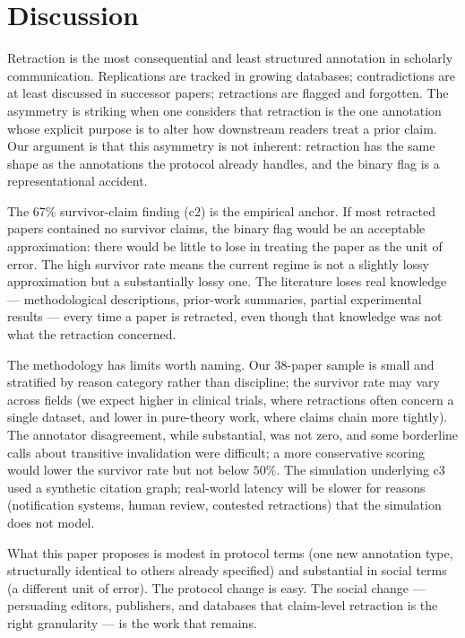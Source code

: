 \documentclass{rrxiv}
\begin{document}
\section{Discussion}
\label{sec:discussion}
Retraction is the most consequential and least structured annotation in scholarly communication. Replications are tracked in growing databases; contradictions are at least discussed in successor papers; retractions are flagged and forgotten. The asymmetry is striking when one considers that retraction is the one annotation whose explicit purpose is to alter how downstream readers treat a prior claim. Our argument is that this asymmetry is not inherent: retraction has the same shape as the annotations the protocol already handles, and the binary flag is a representational accident.

The 67\% survivor-claim finding (c2) is the empirical anchor. If most retracted papers contained no survivor claims, the binary flag would be an acceptable approximation: there would be little to lose in treating the paper as the unit of error. The high survivor rate means the current regime is not a slightly lossy approximation but a substantially lossy one. The literature loses real knowledge --- methodological descriptions, prior-work summaries, partial experimental results --- every time a paper is retracted, even though that knowledge was not what the retraction concerned.

The methodology has limits worth naming. Our 38-paper sample is small and stratified by reason category rather than discipline; the survivor rate may vary across fields (we expect higher in clinical trials, where retractions often concern a single dataset, and lower in pure-theory work, where claims chain more tightly). The annotator disagreement, while substantial, was not zero, and some borderline calls about transitive invalidation were difficult; a more conservative scoring would lower the survivor rate but not below $50\%$. The simulation underlying c3 used a synthetic citation graph; real-world latency will be slower for reasons (notification systems, human review, contested retractions) that the simulation does not model.

What this paper proposes is modest in protocol terms (one new annotation type, structurally identical to others already specified) and substantial in social terms (a different unit of error). The protocol change is easy. The social change --- persuading editors, publishers, and databases that claim-level retraction is the right granularity --- is the work that remains.
\end{document}
